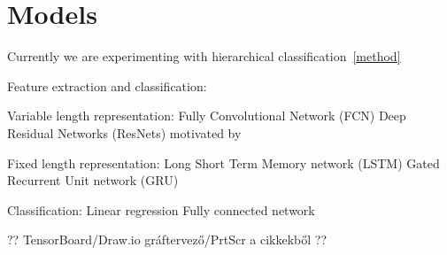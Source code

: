 \section{Models}

Currently we are experimenting with hierarchical classification~\ref{method}

Feature extraction and classification:

Variable length representation:
Fully Convolutional Network (FCN) \cite{lecun1995convolutional, mittelman2015time}
Deep Residual Networks (ResNets) motivated by \cite{he2016deep, wang2016time}

Fixed length representation:
Long Short Term Memory network (LSTM)  \cite{hochreiter1997long, malhotra2015long}
Gated Recurrent Unit network (GRU) \cite{chung2014empirical}

Classification:
Linear regression
Fully connected network \cite{girshick2014rich}

?? TensorBoard/Draw.io gráftervező/PrtScr a cikkekből ??
